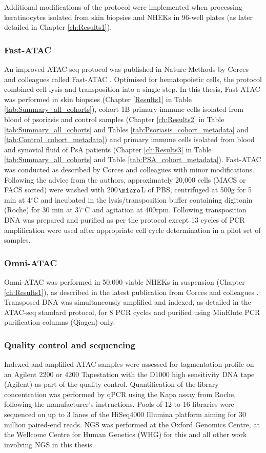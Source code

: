 Additional modifications of the protocol were implemented when processing keratinocytes isolated from skin biopsies and NHEKs in 96-well plates \parencite{Bao2015} (as later detailed in Chapter \ref{ch:Results1}).

\subsubsection{Fast-ATAC}
An improved ATAC-seq protocol was published in Nature Methods by Corces and colleagues called Fast-ATAC \parencite{Corces2016}. Optimised for hematopoietic cells, the protocol combined cell lysis and transposition into a single step. In this thesis, Fast-ATAC was performed in skin biopsies (Chapter \ref{Results1} in Table \ref{tab:Summary_all_cohorts}), cohort 1B primary immune cells isolated from blood of psoriasis and control samples (Chapter \ref{ch:Results2} in Table \ref{tab:Summary_all_cohorts} and Tables \ref{tab:Psoriasis_cohort_metadata} and \ref{tab:Control_cohort_metadata}) and primary immune cells isolated from blood and synovial fluid of PsA patients (Chapter \ref{ch:Results3} in Table \ref{tab:Summary_all_cohorts} and Table \ref{tab:PSA_cohort_metadata}). Fast-ATAC was conducted as described by Corces and colleagues with minor modifications. Following the advice from the authors, approximately 20,000 cells (MACS or FACS sorted) were washed with 200$\micro$L of PBS, centrifuged at 500g for 5 min at 4$^\circ$C and incubated in the lysis/transposition buffer containing digitonin (Roche) for 30 min at 37{$^\circ$}C and agitation at 400rpm. Following transposition DNA was prepared and purified as per the protocol except 13 cycles of PCR amplification were used after appropriate cell cycle determination in a pilot set of samples.

\subsubsection{Omni-ATAC}
Omni-ATAC was performed in 50,000 viable NHEKs in suspension (Chapter \ref{ch:Results1}), as described in the latest publication from Corces and colleagues \parencite{Corces2017}. Transposed DNA was simultaneously amplified and indexed, as detailed in the ATAC-seq standard protocol, for 8 PCR cycles and purified using MinElute PCR purification columns (Qiagen) only. 


\subsubsection{Quality control and sequencing}
Indexed and amplified ATAC samples were assessed for tagmentation profile on an Agilent 2200 or 4200 Tapestation with the D1000 high sensitivity DNA tape (Agilent) as part of the quality control. Quantification of the library concentration was performed by qPCR using the Kapa assay from Roche, following the manufacturer's instructions. Pools of 12 to 16 libraries were sequenced on up to 3 lanes of the HiSeq4000 Illumina platform  aiming for 30 million paired-end reads. NGS was performed at the Oxford Genomics Centre, at the Wellcome Centre for Human Genetics (WHG) for this and all other work involving NGS in this thesis.

